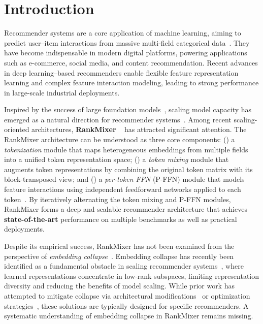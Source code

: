 \documentclass[sigconf,screen]{acmart}
\newcommand{\rankmixer}{RankMixer }
\begin{document}
\section{Introduction}
\label{sec:intro}

Recommender systems are a core application of machine learning, aiming to predict user–item interactions from massive multi-field categorical data~\citep{multi-field-categorical-data}. 
They have become indispensable in modern digital platforms, powering applications such as e-commerce, social media, and content recommendation. 
Recent advances in deep learning–based recommenders enable flexible feature representation learning and complex feature interaction modeling, leading to strong performance in large-scale industrial deployments.

Inspired by the success of large foundation models~\citep{foundation-model-clip,foundation-model-gpt4,foundation-model-latentdiffusion,foundation-model-sam}, scaling model capacity has emerged as a natural direction for recommender systems~\citep{scaling-law-rec-1-wukong,scaling-law-rec-2,scaling-law-rec-3,scaling-law-rec-4}. 
Among recent scaling-oriented architectures, \textbf{\rankmixer}~\cite{rankmixer} has attracted significant attention. 
The \rankmixer architecture can be understood as three core components:
(\textbf{}) a \textit{tokenization} module that maps heterogeneous embeddings from multiple fields into a unified token representation space;
(\textbf{}) a \textit{token mixing} module that augments token representations by combining the original token matrix with its block-transposed view; and
(\textbf{}) a \textit{per-token FFN} (P-FFN) module that models feature interactions using independent feedforward networks applied to each token~\cite{feature-interaction-1,feature-interaction-2}. 
By iteratively alternating the token mixing and P-FFN modules, \rankmixer forms a deep and scalable recommender architecture that achieves \textbf{state-of-the-art} performance on multiple benchmarks as well as practical deployments.

Despite its empirical success, \rankmixer has not been examined from the perspective of \textit{embedding collapse}~\cite{embedding-collapse-1-multiembedding}. 
Embedding collapse has recently been identified as a fundamental obstacle in scaling recommender systems~\citep{embedding-collapse-1-multiembedding,embedding-collapse-2,embedding-collapse-3,embedding-collapse-4-ulrec,feagen}, where learned representations concentrate in low-rank subspaces, limiting representation diversity and reducing the benefits of model scaling. 
While prior work has attempted to mitigate collapse via architectural modifications~\cite{embedding-collapse-1-multiembedding} or optimization strategies~\cite{CovLoss,embedding-collapse-useME-3}, these solutions are typically designed for specific recommenders. 
A systematic understanding of embedding collapse in \rankmixer remains missing.
\end{document}
